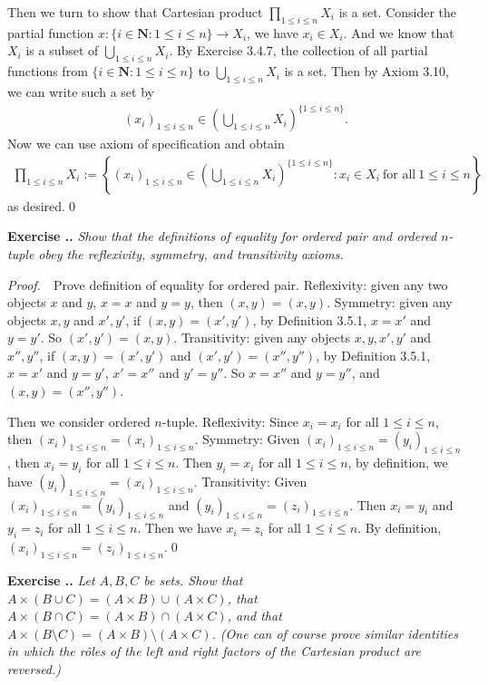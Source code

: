 \documentclass{book}
\newcommand{\pff}{\vspace{.25em}\noindent\emph{Proof.}~~}
\newcounter{Exercise}[section]
\renewcommand{\theExercise}{\thesection.\arabic{Exercise}.}
\newcommand{\new}{\vspace{1.5em}\noindent\textbf{{Exercise \stepcounter{Exercise}\textbf{\theExercise}}} }
\begin{document}
Then we turn to show that Cartesian product $\prod_{1\leq i\leq n}X_i$ is a set. Consider the partial function $x:\{i\in\mathbf{N}:1\leq i\leq n\}\to X_i$, we have $x_i\in X_i$. And we know that $X_i$ is a subset of $\bigcup_{1\leq i\leq n}X_i$. By Exercise 3.4.7, the collection of all partial functions from $\{i\in\mathbf{N}:1\leq i\leq n\}$ to $\bigcup_{1\leq i\leq n}X_i$ is a set. Then by Axiom 3.10, we can write such a set by
    \begin{align*}
        (x_i)_{1\leq i\leq n}\in\left(\bigcup_{1\leq i\leq n}X_i\right)^{\{1\leq i\leq n\}}.
    \end{align*}
Now we can use axiom of specification and obtain
    \begin{align*}
        \prod_{1\leq i\leq n}X_i:=\left\{(x_i)_{1\leq i\leq n}\in\left(\bigcup_{1\leq i\leq n}X_i\right)^{\{1\leq i\leq n\}}:x_i\in X_i\ \textrm{for all}\ 1\leq i\leq n\right\}
    \end{align*}
as desired.\qed

\new\emph{Show that the definitions of equality for ordered pair and ordered $n$-tuple obey the reflexivity, symmetry, and transitivity axioms.}

\pff Prove definition of equality for ordered pair. Reflexivity: given any two objects $x$ and $y$, $x=x$ and $y=y$, then $(x,y)=(x,y)$. Symmetry: given any objects $x,y$ and $x',y'$, if $(x,y)=(x',y')$, by Definition 3.5.1, $x=x'$ and $y=y'$. So $(x',y')=(x,y)$. Transitivity: given any objects $x,y,x',y'$ and $x'',y''$, if $(x,y)=(x',y')$ and $(x',y')=(x'',y'')$, by Definition 3.5.1, $x=x'$ and $y=y'$, $x'=x''$ and $y'=y''$. So $x=x''$ and $y=y''$, and $(x,y)=(x'',y'')$.

Then we consider ordered $n$-tuple. Reflexivity: Since $x_i=x_i$ for all $1\leq i\leq n$, then $(x_i)_{1\leq i\leq n}=(x_i)_{1\leq i\leq n}$. Symmetry: Given $(x_i)_{1\leq i\leq n}=(y_i)_{1\leq i\leq n}$, then $x_i=y_i$ for all $1\leq i\leq n$. Then $y_i=x_i$ for all $1\leq i\leq n$, by definition, we have $(y_i)_{1\leq i\leq n}=(x_i)_{1\leq i\leq n}$. Transitivity: Given $(x_i)_{1\leq i\leq n}=(y_i)_{1\leq i\leq n}$ and $(y_i)_{1\leq i\leq n}=(z_i)_{1\leq i\leq n}$. Then $x_i=y_i$ and $y_i=z_i$ for all $1\leq i\leq n$. Then we have $x_i=z_i$ for all $1\leq i\leq n$. By definition, $(x_i)_{1\leq i\leq n}=(z_i)_{1\leq i\leq n}$.\qed

\new\emph{Let $A,B,C$ be sets. Show that $A\times(B\cup C)=(A\times B)\cup(A\times C)$, that $A\times(B\cap C)=(A\times B)\cap (A\times C)$, and that $A\times(B\setminus C)=(A\times B)\setminus(A\times C)$. (One can of course prove similar identities in which the r\^oles of the left and right factors of the Cartesian product are reversed.)}
\end{document}
